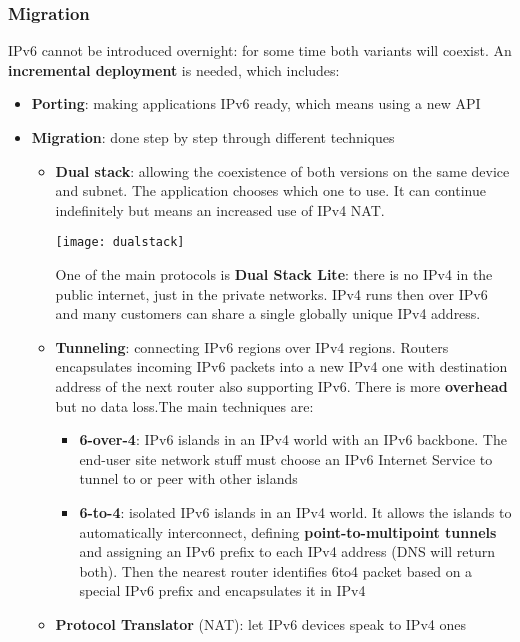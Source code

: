 \subsubsection{Migration}
IPv6 cannot be introduced overnight: for some time both variants will coexist. An \textbf{incremental deployment} is needed, which includes:
\begin{itemize}
	\item \textbf{Porting}: making applications IPv6 ready, which means using a new API
	\item \textbf{Migration}: done step by step through different techniques
	\begin{itemize}
		\item \textbf{Dual stack}: allowing the coexistence of both versions on the same device and subnet. The application chooses which one to use. It can continue indefinitely but means an increased use of IPv4 NAT.
		\begin{center}
			\texttt{[image: dualstack]}
		\end{center}
		One of the main protocols is \textbf{Dual Stack Lite}: there is no IPv4 in the public internet, just in the private networks. IPv4 runs then over IPv6 and many customers can share a single globally unique IPv4 address.
		\item \textbf{Tunneling}: connecting IPv6 regions over IPv4 regions. Routers encapsulates incoming IPv6 packets into a new IPv4 one with destination address of the next router also supporting IPv6. There is more \textbf{overhead} but no data loss.The main techniques are:
		\begin{itemize}
			\item \textbf{6-over-4}: IPv6 islands in an IPv4 world with an IPv6 backbone. The end-user site network stuff must choose an IPv6 Internet Service to tunnel to or peer with other islands
			\item \textbf{6-to-4}: isolated IPv6 islands in an IPv4 world. It allows the islands to automatically interconnect, defining \textbf{point-to-multipoint tunnels} and assigning an IPv6 prefix to each IPv4 address (DNS will return both). Then the nearest router identifies 6to4 packet based on a special IPv6 prefix and encapsulates it in IPv4
		\end{itemize}
		\item \textbf{Protocol Translator} (NAT): let IPv6 devices speak to IPv4 ones
	\end{itemize}
\end{itemize}

